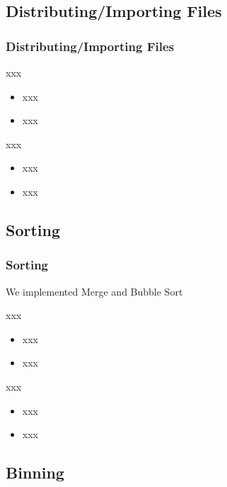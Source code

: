 \documentclass{beamer}
\begin{document}
\subsection{Distributing/Importing Files}

\begin{frame}	
	\frametitle{Distributing/Importing Files}
	
	\begin{block}{xxx}
		\begin{itemize}
			\item xxx
			\item xxx
		\end{itemize}
	\end{block}
	
	\begin{block}{xxx}
		\begin{itemize}
			\item xxx
			\item xxx
		\end{itemize}
	\end{block}
\end{frame}

\subsection{Sorting}

\begin{frame}	
	\frametitle{Sorting}
	
	We implemented Merge and Bubble Sort
	
	\begin{block}{xxx}
		\begin{itemize}
			\item xxx
			\item xxx
		\end{itemize}
	\end{block}
	
	\begin{block}{xxx}
		\begin{itemize}
			\item xxx
			\item xxx
		\end{itemize}
	\end{block}
\end{frame}

\subsection{Binning}
\end{document}
